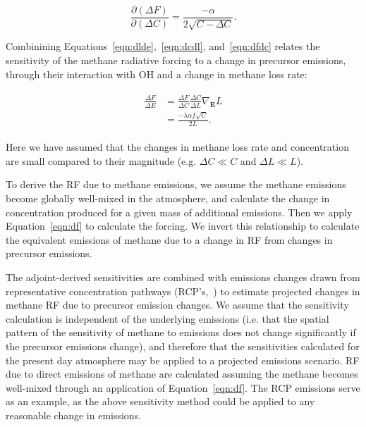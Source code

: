 \begin{equation}
\frac{\partial (\Delta F)}{\partial (\Delta C)} = \frac{-\alpha}{2\sqrt{C-\Delta C}}.
\label{eqn:dfdc}
\end{equation}

Combinining Equations~\ref{eqn:dlde},~\ref{eqn:dcdl}, and~\ref{eqn:dfdc} relates the sensitivity of the methane radiative forcing to a change in precursor emissions, through their interaction with OH and a change in methane loss rate:

\begin{equation}
\begin{align}
\begin{split}
\frac{\Delta F}{\Delta E} &= \frac{\Delta F}{\Delta C} \frac{\Delta C}{\Delta L} \nabla_{\mathbf{E}} L \\
                          &= \frac{-\lambda \alpha f \sqrt{C}}{2L}.
\end{split}
\label{eqn:dfde}
\end{align}
\end{equation}

Here we have assumed that the changes in methane loss rate and concentration are small compared to their magnitude (e.g. $\Delta C \ll C$ and $\Delta L \ll L$).

To derive the RF due to methane emissions, we assume the methane emissions become globally well-mixed in the atmosphere, and calculate the change in concentration produced for a given mass of additional emissions. Then we apply Equation~\ref{eqn:df} to calculate the forcing. We invert this relationship to calculate the equivalent emissions of methane due to a change in RF from changes in precursor emissions.

The adjoint-derived sensitivities are combined with emissions changes drawn from representative concentration pathways (RCP's,~\citet{ref:lamarque2011,ref:vanvuuren2011}) to estimate projected changes in methane RF due to precursor emission changes. We assume that the sensitivity calculation is independent of the underlying emissions (i.e. that the spatial pattern of the sensitivity of methane to emissions does not change significantly if the precursor emissions change), and therefore that the sensitivities calculated for the present day atmosphere may be applied to a projected emissions scenario. RF due to direct emissions of methane are calculated assuming the methane becomes well-mixed through an application of Equation~\ref{eqn:df}. The RCP emissions serve as an example, as the above sensitivity method could be applied to any reasonable change in emissions.

